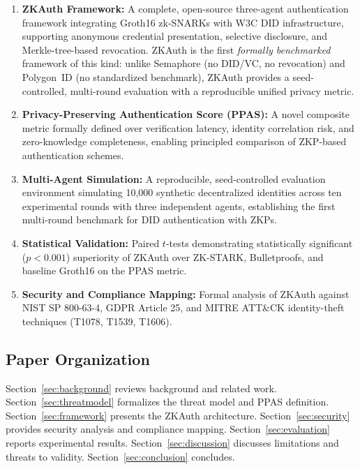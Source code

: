 \documentclass[journal,12pt,onecolumn]{IEEEtran}
\begin{document}
\begin{enumerate}
  \item \textbf{ZKAuth Framework:} A complete, open-source three-agent
  authentication framework integrating Groth16 zk-SNARKs with W3C DID
  infrastructure, supporting anonymous credential presentation,
  selective disclosure, and Merkle-tree-based revocation. ZKAuth is
  the first \emph{formally benchmarked} framework of this kind: unlike
  Semaphore \cite{gurkan2021semaphore} (no DID/VC, no revocation) and
  Polygon~ID \cite{polygonid2023} (no standardized benchmark), ZKAuth
  provides a seed-controlled, multi-round evaluation with a reproducible
  unified privacy metric.
  \item \textbf{Privacy-Preserving Authentication Score (PPAS):} A novel
  composite metric formally defined over verification latency, identity
  correlation risk, and zero-knowledge completeness, enabling principled
  comparison of ZKP-based authentication schemes.
  \item \textbf{Multi-Agent Simulation:} A reproducible, seed-controlled
  evaluation environment simulating 10,000 synthetic decentralized
  identities across ten experimental rounds with three independent agents,
  establishing the first multi-round benchmark for DID authentication
  with ZKPs.
  \item \textbf{Statistical Validation:} Paired $t$-tests demonstrating
  statistically significant ($p < 0.001$) superiority of ZKAuth over
  ZK-STARK, Bulletproofs, and baseline Groth16 on the PPAS metric.
  \item \textbf{Security and Compliance Mapping:} Formal analysis of
  ZKAuth against NIST SP 800-63-4, GDPR Article 25, and MITRE ATT\&CK
  identity-theft techniques (T1078, T1539, T1606).
\end{enumerate}

\subsection{Paper Organization}

Section~\ref{sec:background} reviews background and related work.
Section~\ref{sec:threatmodel} formalizes the threat model and PPAS
definition. Section~\ref{sec:framework} presents the ZKAuth architecture.
Section~\ref{sec:security} provides security analysis and compliance
mapping. Section~\ref{sec:evaluation} reports experimental results.
Section~\ref{sec:discussion} discusses limitations and threats to
validity. Section~\ref{sec:conclusion} concludes.
\end{document}
